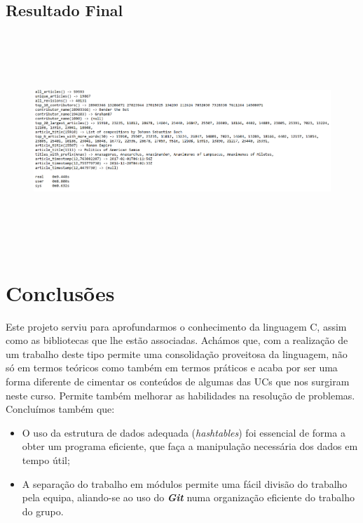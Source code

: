 \documentclass[a4paper]{article}
\begin{document}
\pagebreak
\subsection{Resultado Final}

\begin{figure}[htbp]
    \centering
    \includegraphics[width = 420pt, height = 230pt]{output}
\end{figure}

\section{Conclusões}
\label{sec:conclusao}
Este projeto serviu para aprofundarmos o conhecimento da linguagem C, assim como as bibliotecas que lhe estão associadas. Achámos que, com a realização de um trabalho deste tipo permite uma consolidação proveitosa da linguagem, não só em termos teóricos como também em termos práticos e acaba por ser uma forma diferente de cimentar os conteúdos de algumas das UCs que nos surgiram neste curso. Permite também melhorar as habilidades na resolução de problemas. Concluímos também que:

\begin{itemize}
        \item O uso da estrutura de dados adequada (\textit{hashtables}) foi essencial de forma a obter um programa eficiente, que faça a manipulação necessária dos dados em tempo útil;
 	    \item A separação do trabalho em módulos permite uma fácil divisão do trabalho pela equipa, aliando-se ao uso do \textbf{\textit{Git}} numa organização eficiente do trabalho do grupo.
\end{itemize}
\end{document}
